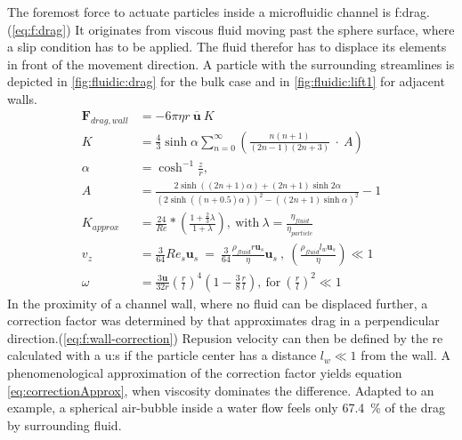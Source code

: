 The foremost force to actuate particles inside a microfluidic channel is \gls{f:drag}.(\cref{eq:f:drag}) It originates from viscous fluid moving past the sphere surface, where a slip condition has to be applied. The fluid therefor has to displace its elements in front of the movement direction.\cite{lit:fluidic:motion_sphere_to_plane_surface} A particle with the surrounding streamlines is depicted in \cref{fig:fluidic:drag} for the bulk case and in \cref{fig:fluidic:lift1} for adjacent walls. 
\begin{align}
	\mathbf{F}_{drag,wall} &= -6 \pi \eta r \ \overline{\mathbf{u}} \ K \label{eq:f:drag}\\
	K &=  \frac{4}{3} \sinh \alpha \sum_{n=0}^{\infty} \left(\frac{n(n+1)}{(2n-1)(2n+3)} \ \cdot \ A \right) \label{eq:f:wall-correction}\\
	\alpha &= \cosh^{-1}\frac{z}{r}, \\ A &= \frac{2 \sinh((2n+1)\alpha) + (2n+1)\sinh2\alpha}{(2\sinh((n+0.5)\alpha))^2 -((2n+1)\sinh\alpha)^2 }-1\\
	K_{approx} &= \frac{24}{\mathit{Re}} *\left(\frac{1+\frac{2}{3}\lambda}{1+\lambda}\right) ,\ \mathrm{with}\ \lambda = \frac{\eta_{fluid}}{ \eta_{particle}}\label{eq:correctionApprox} \\
	v_z &= \frac{3}{64} \mathit{Re}_s \mathbf{u}_s \ = \ \frac{3}{64} \frac{\rho_{fluid} r \mathbf{u}_s}{\eta} \mathbf{u}_s \ , \ (\frac{\rho_{fluid} l_w \mathbf{u}_s}{\eta}) \ll 1\label{eq:repulsion_v}\\
	\omega &= \frac{3 \mathbf{u}}{32 r}\left(\frac{r}{l}\right)^{4}\left(1-\frac{3}{8} \frac{r}{l}\right) \mathrm{, \ for \ } (\frac{r}{l})^2 \ll 1	\label{eq:angularFreq}
\end{align}
\clearpage
In the proximity of a channel wall, where no fluid can be displaced further, a correction factor was determined by \citet{lit:fluid:Hydrodynamics} that approximates drag in a perpendicular direction.(\cref{eq:f:wall-correction}) Repusion velocity can then be defined by the \acrlong{re} calculated with a \gls{u:s} if the particle center has a distance $l_w \ll 1$ from the wall.\cite{lit:fluid:velocities, lit:fluidic:motion_sphere_surface_2009} A phenomenological approximation of the correction factor yields equation \cref{eq:correctionApprox}, when viscosity dominates the difference. Adapted to an example, a spherical air-bubble inside a water flow feels only \SI{67.4}{\percent} of the drag by surrounding fluid.

\begin{figure}[!htb]
	\hfill
	\label{fig:fluidic:particleRotation}
\end{figure}

